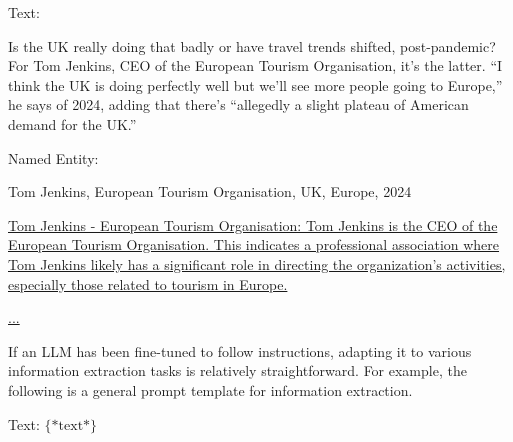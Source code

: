 \vspace{0.5em}
\begin{tcolorbox}

\begingroup
\setlength{\leftskip}{2em}
\setlength{\rightskip}{2em}


\vspace{0.7em}

Text:

Is the UK really doing that badly or have travel trends shifted, post-pandemic? For Tom Jenkins, CEO of the European Tourism Organisation, it's the latter. ``I think the UK is doing perfectly well but we'll see more people going to Europe,'' he says of 2024, adding that there's ``allegedly a slight plateau of American demand for the UK.''

\vspace{0.7em}

Named Entity:

Tom Jenkins, European Tourism Organisation, UK, Europe, 2024

\vspace{0.7em}

\uline{Tom Jenkins - European Tourism Organisation: Tom Jenkins is the CEO of the European Tourism Organisation. This indicates a professional association where Tom Jenkins likely has a significant role in directing the organization's activities, especially those related to tourism in Europe.}

\vspace{0.3em}

\uline{...}

\endgroup

\end{tcolorbox}
\vspace{0.5em}

If an LLM has been fine-tuned to follow instructions, adapting it to various information extraction tasks is relatively straightforward. For example, the following is a general prompt template for information extraction.

\vspace{0.5em}
\begin{tcolorbox}

\begingroup
\setlength{\leftskip}{2em}
\setlength{\rightskip}{2em}


\vspace{0.7em}

Text: $\{*\mathrm{text}*\}$

\vspace{0.7em}

\underline{\hspace{2em}}

\endgroup

\end{tcolorbox}
\vspace{0.5em}

